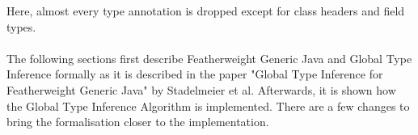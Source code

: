 Here, almost every type annotation is dropped except for class headers and field types.
\\
\\
The following sections first describe Featherweight Generic Java and Global Type Inference formally as it is described in the paper "Global Type Inference for Featherweight Generic Java"\cite{FGJ} by Stadelmeier et al. Afterwards, it is shown how the Global Type Inference Algorithm is implemented. There are a few changes to bring the formalisation closer to the implementation.
